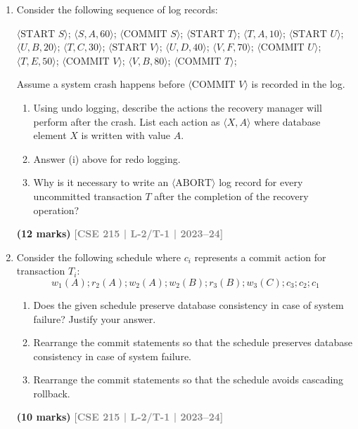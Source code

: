 \documentclass[12pt]{article}
\newcommand{\yr}[1]{\hfill\textcolor{gray}{\small\textbf{[#1]}}}
\newcommand{\mk}[1]{\textcolor{orange!70!black}{\small\textbf{(#1 marks)}}}
\begin{document}
\begin{enumerate}
\item Consider the following sequence of log records:
\begin{center}
\small\ttfamily
$\langle\text{START } S\rangle$; $\langle S, A, 60\rangle$; $\langle\text{COMMIT } S\rangle$; $\langle\text{START } T\rangle$; $\langle T, A, 10\rangle$; $\langle\text{START } U\rangle$; $\langle U, B, 20\rangle$; $\langle T, C, 30\rangle$; $\langle\text{START } V\rangle$; $\langle U, D, 40\rangle$; $\langle V, F, 70\rangle$; $\langle\text{COMMIT } U\rangle$; $\langle T, E, 50\rangle$; $\langle\text{COMMIT } V\rangle$; $\langle V, B, 80\rangle$; $\langle\text{COMMIT } T\rangle$;
\end{center}
Assume a system crash happens before $\langle\text{COMMIT } V\rangle$ is recorded in the log.
\begin{enumerate}
  \item Using undo logging, describe the actions the recovery manager will perform after the crash. List each action as $\langle X, A\rangle$ where database element $X$ is written with value $A$.
  \item Answer (i) above for redo logging.
  \item Why is it necessary to write an $\langle\text{ABORT}\rangle$ log record for every uncommitted transaction $T$ after the completion of the recovery operation?
\end{enumerate}
\mk{12} \yr{CSE 215 | L-2/T-1 | 2023--24}


\item Consider the following schedule where $c_i$ represents a commit action for transaction $T_i$:
\[w_1(A); r_2(A); w_2(A); w_2(B); r_3(B); w_3(C); c_3; c_2; c_1\]
\begin{enumerate}
  \item Does the given schedule preserve database consistency in case of system failure? Justify your answer.
  \item Rearrange the commit statements so that the schedule preserves database consistency in case of system failure.
  \item Rearrange the commit statements so that the schedule avoids cascading rollback.
\end{enumerate}
\mk{10} \yr{CSE 215 | L-2/T-1 | 2023--24}



\end{enumerate}
\end{document}
